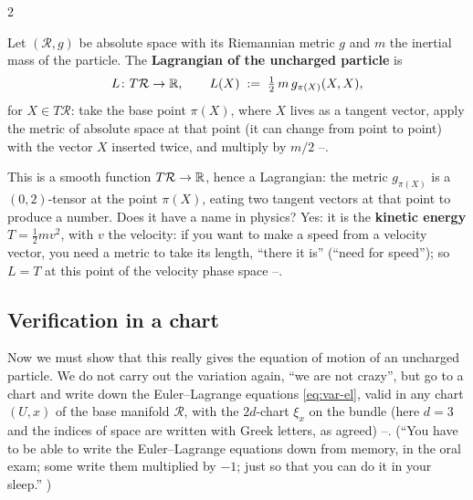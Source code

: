 \begin{paracol}{2}
\begin{definition}\label{def:var-Lfree}
Let $(\mathcal R,g)$ be absolute space with its Riemannian metric $g$ and $m$ the inertial mass of the particle. The \textbf{Lagrangian of the uncharged particle} is
\begin{equation}\label{eq:var-Lfree}
  L\colon T\mathcal R\to\mathbb{R},\qquad L(X)\;:=\;\tfrac12\,m\,g_{\pi(X)}(X,X),
\end{equation}
for $X\in T\mathcal R$: take the base point $\pi(X)$, where $X$ lives as a tangent vector, apply the metric of absolute space at that point (it can change from point to point) with the vector $X$ inserted twice, and multiply by $m/2$ --.
\end{definition}
This is a smooth function $T\mathcal R\to\mathbb{R}$, hence a Lagrangian: the metric $g_{\pi(X)}$ is a $(0,2)$-tensor at the point $\pi(X)$, eating two tangent vectors at that point to produce a number. Does it have a name in physics? Yes: it is the \textbf{kinetic energy} $T=\tfrac12 mv^2$, with $v$ the velocity: if you want to make a speed from a velocity vector, you need a metric to take its length, ``there it is'' (``need for speed''); so $L=T$ at this point of the velocity phase space --.

\subsection{Verification in a chart}\label{ssec:var-verify}

Now we must show that this really gives the equation of motion of an uncharged particle. We do not carry out the variation again, ``we are not crazy'', but go to a chart and write down the Euler--Lagrange equations \eqref{eq:var-el}, valid in any chart $(U,x)$ of the base manifold $\mathcal R$, with the $2d$-chart $\xi_x$ on the bundle (here $d=3$ and the indices of space are written with Greek letters, as agreed) --. (``You have to be able to write the Euler--Lagrange equations down from memory, in the oral exam; some write them multiplied by $-1$; just so that you can do it in your sleep.'' )


\end{paracol}
